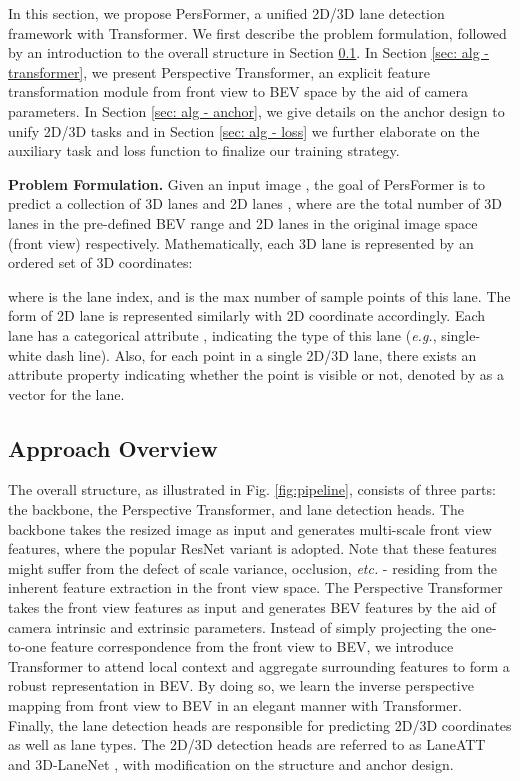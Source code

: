 \documentclass[runningheads]{llncs}
\begin{document}
In this section, we propose PersFormer, a unified 2D/3D lane detection framework with Transformer. 
We first describe the problem formulation, followed by an introduction to the overall structure in Section \ref{sec: alg - pipeline}. 
In Section \ref{sec: alg - transformer}, we present Perspective Transformer, an explicit feature transformation module
{from front view to BEV space by the aid of camera parameters}.
In Section \ref{sec: alg - anchor}, we give details on the anchor design to unify 2D/3D tasks
and in Section \ref{sec: alg - loss} we further elaborate on the auxiliary task and loss function to finalize our training strategy.


\textbf{Problem Formulation.}
Given an input image , the goal of PersFormer is to predict a collection of 3D lanes  and 2D lanes , 
where  are the total number of 3D lanes in the pre-defined BEV range and 2D lanes in the original image space (front view) respectively.
Mathematically, each 3D lane  is represented by an ordered set of 3D coordinates:

where  is the lane index, and  is the max number of sample points of this lane. The form of 2D lane is represented similarly with 2D coordinate  accordingly.
Each lane has a categorical attribute , indicating the type of this lane (\textit{e.g.}, 
single-white dash line). 
Also, for each point in a single 2D/3D lane, there exists an attribute property indicating whether the point is visible or not, denoted by  as a vector for the lane.




\subsection{Approach Overview}\label{sec: alg - pipeline}


The overall structure, as illustrated in Fig. \ref{fig:pipeline}, consists of three parts: the backbone, the Perspective Transformer, and lane detection heads.
The backbone takes the resized image as input and generates multi-scale front view features, 
where the popular ResNet variant \cite{tan2019efficientnet} is adopted.
Note that these features might suffer from the defect of scale variance, occlusion,\textit{ etc.} - residing from the inherent feature extraction in the front view space.
The Perspective Transformer takes the front view features as input and generates BEV features by the aid of camera intrinsic and extrinsic parameters. 
Instead of simply projecting the one-to-one feature correspondence from the front view to BEV, we introduce Transformer to attend local context 
and aggregate surrounding features to form a robust representation in BEV.
By doing so, we learn the inverse perspective mapping from front view to BEV in an elegant manner with Transformer.
Finally, the lane detection heads are responsible for predicting 2D/3D coordinates as well as lane types.
The 2D/3D detection heads are referred to as LaneATT \cite{tabelini2021keep} and 3D-LaneNet \cite{Garnett_2019_ICCV}, with modification on the structure and anchor design.
\end{document}
